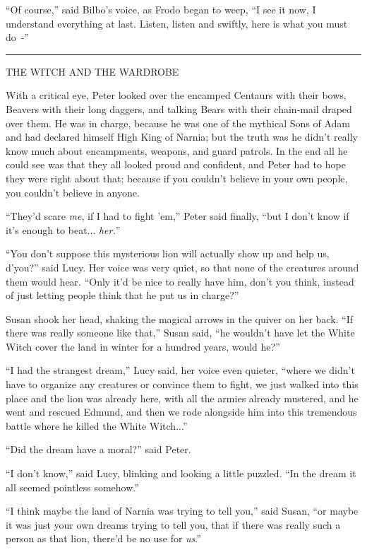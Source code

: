``Of course,'' said Bilbo's voice, as Frodo began to weep, ``I see it now, I understand everything at last. Listen, listen and swiftly, here is what you must do~-''

\begin{center}\rule{3in}{0.4pt}\end{center}

THE WITCH AND THE WARDROBE

With a critical eye, Peter looked over the encamped Centaurs with their bows, Beavers with their long daggers, and talking Bears with their chain-mail draped over them. He was in charge, because he was one of the mythical Sons of Adam and had declared himself High King of Narnia; but the truth was he didn't really know much about encampments, weapons, and guard patrols. In the end all he could see was that they all looked proud and confident, and Peter had to hope they were right about that; because if you couldn't believe in your own people, you couldn't believe in anyone.

``They'd scare \emph{me}, if I had to fight 'em,'' Peter said finally, ``but I don't know if it's enough to beat... \emph{her.}''

``You don't suppose this mysterious lion will actually show up and help us, d'you?'' said Lucy. Her voice was very quiet, so that none of the creatures around them would hear. ``Only it'd be nice to really have him, don't you think, instead of just letting people think that he put us in charge?''

Susan shook her head, shaking the magical arrows in the quiver on her back. ``If there was really someone like that,'' Susan said, ``he wouldn't have let the White Witch cover the land in winter for a hundred years, would he?''

``I had the strangest dream,'' Lucy said, her voice even quieter, ``where we didn't have to organize any creatures or convince them to fight, we just walked into this place and the lion was already here, with all the armies already mustered, and he went and rescued Edmund, and then we rode alongside him into this tremendous battle where he killed the White Witch...''

``Did the dream have a moral?'' said Peter.

``I don't know,'' said Lucy, blinking and looking a little puzzled. ``In the dream it all seemed pointless somehow.''

``I think maybe the land of Narnia was trying to tell you,'' said Susan, ``or maybe it was just your own dreams trying to tell you, that if there was really such a person as that lion, there'd be no use for \emph{us}.''

